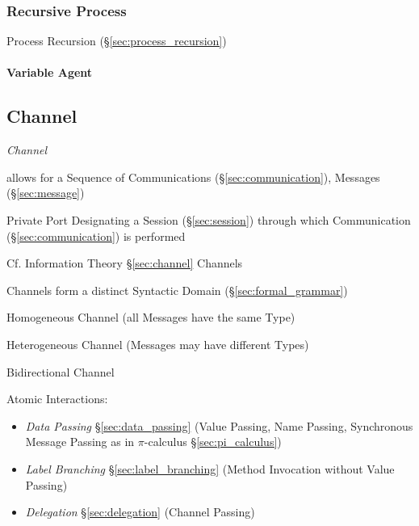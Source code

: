 \subsubsection{Recursive Process}\label{sec:recursive_process}

Process Recursion (\S\ref{sec:process_recursion})



\paragraph{Variable Agent}\label{sec:variable_agent}\hfill



\subsection{Channel}\label{sec:process_channel}

\emph{Channel}

allows for a Sequence of Communications (\S\ref{sec:communication}),
Messages (\S\ref{sec:message})

Private Port Designating a Session (\S\ref{sec:session}) through which
Communication (\S\ref{sec:communication}) is performed
\cite{honda-vasconcelos-kubo98}

\fist Cf. Information Theory \S\ref{sec:channel} Channels

Channels form a distinct Syntactic Domain (\S\ref{sec:formal_grammar})
\cite{honda-vasconcelos-kubo98}

Homogeneous Channel (all Messages have the same Type)

Heterogeneous Channel (Messages may have different Types)

Bidirectional Channel

Atomic Interactions:
\begin{itemize}
  \item \emph{Data Passing} \S\ref{sec:data_passing} (Value Passing,
    Name Passing, Synchronous Message Passing as in $\pi$-calculus
    \S\ref{sec:pi_calculus})
  \item \emph{Label Branching} \S\ref{sec:label_branching} (Method
    Invocation without Value Passing)
  \item \emph{Delegation} \S\ref{sec:delegation} (Channel Passing)
\end{itemize}

